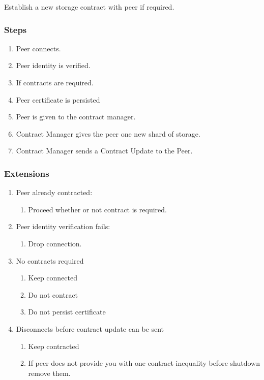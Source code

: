 \documentclass[11pt, a4paper, twoside]{report}
\begin{document}
Establish a new storage contract with peer if required.

\subsubsection{Steps}

\begin{enumerate}
 \item Peer connects.
 \item Peer identity is verified.
 \item If contracts are required.
 \item Peer certificate is persisted
 \item Peer is given to the contract manager.
 \item Contract Manager gives the peer one new shard of storage.
 \item Contract Manager sends a Contract Update to the Peer.
\end{enumerate}

\subsubsection{Extensions}
\begin{enumerate}
  \item Peer already contracted:
	\begin{enumerate}
	  \item Proceed whether or not contract is required.
	\end{enumerate}
  \item Peer identity verification fails:
	\begin{enumerate}
	  \item Drop connection.
	\end{enumerate}
  \item No contracts required
	\begin{enumerate}
	  \item Keep connected
	  \item Do not contract
	  \item Do not persist certificate
	\end{enumerate}
  \item Disconnects before contract update can be sent
	\begin{enumerate}
	  \item Keep contracted
	  \item If peer does not provide you with one contract inequality before shutdown remove them.
	\end{enumerate}
\end{enumerate}
\end{document}
